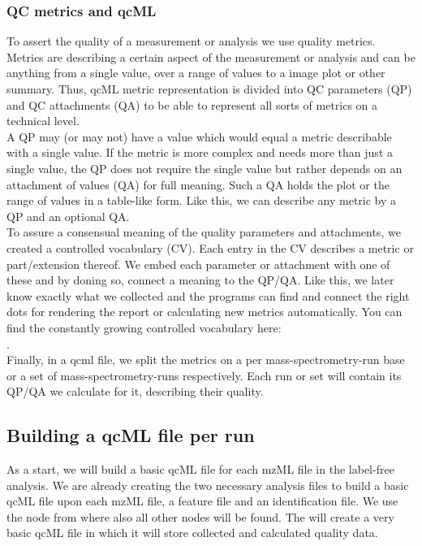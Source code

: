 \subsubsection*{QC metrics and qcML}
To assert the quality of a measurement or analysis we use quality metrics. Metrics are describing a certain aspect of the measurement or analysis and can be anything from a single value, over a range of values to a image plot or other summary. Thus, qcML metric representation is divided into QC parameters (QP) and QC attachments (QA) to be able to represent all sorts of metrics on a technical level.\\
A QP may (or may not) have a value which would equal a metric describable with a single value. If the metric is more complex and needs more than just a single value, the QP does not require the single value but rather depends on an attachment of values (QA) for full meaning. Such a QA holds the plot or the range of values in a table-like form. Like this, we can describe any metric by a QP and an optional QA.\\
To assure a consensual meaning of the quality parameters and attachments, we created a controlled vocabulary (CV). Each entry in the CV describes a metric or part/extension thereof. We embed each parameter or attachment with one of these and by doning so, connect a meaning to the QP/QA. Like this, we later know exactly what we collected and the programs can find and connect the right dots for rendering the report or calculating new metrics automatically. You can find the constantly growing controlled vocabulary here:\\ .\\
Finally, in a qcml file, we split the metrics on a per mass-spectrometry-run base or a set of mass-spectrometry-runs respectively. Each run or set will contain its QP/QA we calculate for it, describing their quality.


\subsection{Building a qcML file per run}
\label{Building a qcML file per run}

As a start, we will build a basic qcML file for each mzML file in the label-free analysis. We are already creating the two necessary analysis files to build a basic qcML file upon each mzML file, a feature file and an identification file. We use the  node from  where also all other  nodes will be found. The  will create a very basic qcML file in which it will store collected and calculated quality data.

